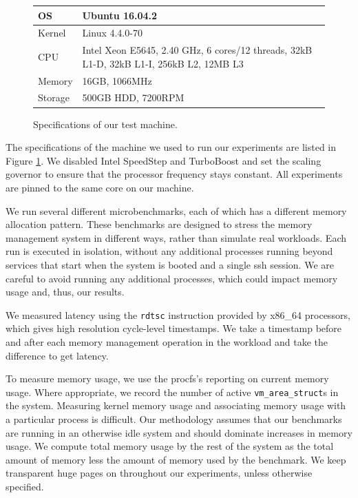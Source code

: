 \documentclass[twocolumn,11pt]{article}
\begin{document}
\begin{figure}[t]
\centering
\begin{tabular}{|l|p{5cm}|} \hline
OS & Ubuntu 16.04.2 \\ \hline
Kernel & Linux 4.4.0-70 \\ \hline
CPU & Intel Xeon E5645, 2.40 GHz, 6 cores/12 threads, 32kB L1-D, 32kB L1-I,
    256kB L2, 12MB L3 \\ \hline
Memory & 16GB, 1066MHz \\ \hline
Storage & 500GB HDD, 7200RPM \\
\hline
\end{tabular}
\caption{Specifications of our test machine.  \label{fig:specs}}
\end{figure}

The specifications of the machine we used to run our experiments are listed in
Figure \ref{fig:specs}. We disabled Intel SpeedStep and TurboBoost and set the scaling governor to ensure
that the processor frequency stays constant. All experiments are pinned to the
same core on our machine. 

We run several different microbenchmarks, each of which has a different memory
allocation pattern. These benchmarks are designed to stress the memory
management system in different ways, rather than simulate real workloads. 
Each run is executed in isolation, without any additional processes
running beyond services that start when the system is booted and a single ssh
session. We are careful to avoid running any additional processes, which could 
impact memory usage and, thus, our results.

We measured latency using the \texttt{rdtsc} instruction provided by x86\_64
processors, which gives high resolution cycle-level timestamps. We take a
timestamp before and after each memory management operation in the workload and
take the difference to get latency.

To measure memory usage, we use the procfs's reporting on current memory usage.
Where appropriate, we record the number of active
\texttt{vm\_area\_struct}s in the system. Measuring kernel memory usage and
associating memory usage with a particular process is difficult. Our methodology assumes
that our benchmarks are running in an otherwise idle system and should dominate
increases in memory usage.  We compute total memory usage by the rest of the
system as the total amount of memory less the amount of memory used by the
benchmark. We keep transparent huge pages on throughout our experiments, unless
otherwise specified.
\end{document}

